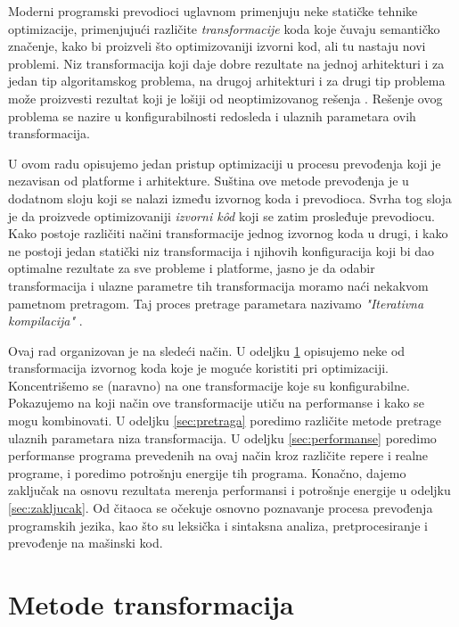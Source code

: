 \documentclass[a4paper]{article}
\begin{document}
\par 
Moderni programski prevodioci uglavnom primenjuju neke statičke tehnike optimizacije, primenjujući različite 
\emph{transformacije} koda koje čuvaju semantičko značenje, kako bi proizveli što optimizovaniji izvorni kod, ali tu nastaju novi problemi. 
Niz transformacija koji daje dobre rezultate na jednoj arhitekturi i za jedan tip algoritamskog problema, 
na drugoj arhitekturi i za drugi tip problema može proizvesti rezultat koji je lošiji od neoptimizovanog rešenja \cite{gheorghita2005iterative}.
Rešenje ovog problema se nazire u konfigurabilnosti redosleda i ulaznih parametara ovih transformacija.
\par
U ovom radu opisujemo jedan pristup optimizaciji u procesu prevođenja koji je nezavisan od platforme i arhitekture. 
Suština ove metode prevođenja je u dodatnom sloju koji se nalazi između izvornog koda i prevodioca. 
Svrha tog sloja je da proizvede optimizovaniji \emph{izvorni k\^{o}d} koji se zatim prosleđuje 
prevodiocu. Kako postoje različiti načini transformacije jednog izvornog koda u drugi, i kako ne postoji jedan statički niz transformacija i njihovih konfiguracija koji bi dao optimalne rezultate za sve probleme i platforme, 
jasno je da odabir transformacija i ulazne parametre tih transformacija moramo naći nekakvom pametnom pretragom. 
Taj proces pretrage parametara nazivamo \emph{"Iterativna kompilacija"} \cite{kisuki2000iterative}.
\par
Ovaj rad organizovan je na sledeći način. 
U odeljku \ref{sec:transformacije} opisujemo neke od transformacija izvornog koda koje je moguće koristiti pri optimizaciji. 
Koncentrišemo se (naravno) na one transformacije koje su konfigurabilne. Pokazujemo na koji način ove transformacije utiču na performanse i kako se mogu kombinovati. 
U odeljku \ref{sec:pretraga} poredimo različite metode pretrage ulaznih parametara niza transformacija.
U odeljku \ref{sec:performanse} poredimo performanse programa prevedenih na ovaj način kroz različite repere i realne programe, i poredimo potrošnju energije tih programa.
Konačno, dajemo zaključak na osnovu rezultata merenja performansi i potrošnje energije u odeljku \ref{sec:zakljucak}.
Od čitaoca se očekuje osnovno poznavanje procesa prevođenja programskih jezika, kao što su leksička i sintaksna analiza, pretprocesiranje i prevođenje na mašinski kod.

\section{Metode transformacija}
\label{sec:transformacije}
\end{document}
